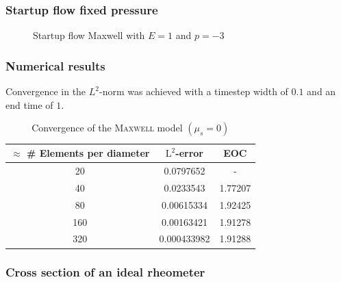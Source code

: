 \documentclass[12pt,a4paper,handout]{beamer}
\theoremstyle{definition}
\theoremstyle{plain}
\begin{document}
\begin{frame}
    \frametitle{Startup flow fixed pressure}
    \begin{figure}
        \caption{Startup flow Maxwell with $E=1$ and $p=-3$}
    \end{figure}
\end{frame}
\begin{frame}
    \frametitle{Numerical results}
    Convergence in the $L^2$-norm was achieved with a timestep width of $0.1$ and an end time of $1$.
    \begin{table}
        \centering
        \begin{tabular}{c|c|c}
            $\approx$ \# Elements per diameter& $\mathrm{L}^2$-error&EOC\\
            \hline
            20 & 0.0797652 & -\\
            40 & 0.0233543 & 1.77207\\
            80 & 0.00615334 & 1.92425\\
            160 & 0.00163421 & 1.91278\\
            320 & 0.000433982 & 1.91288
        \end{tabular}
        \caption{Convergence of the \textsc{Maxwell} model $(\mu_s=0)$}
    \end{table}
\end{frame}
\begin{frame}
    \frametitle{Cross section of an ideal rheometer}
    
\end{frame}
\end{document}
